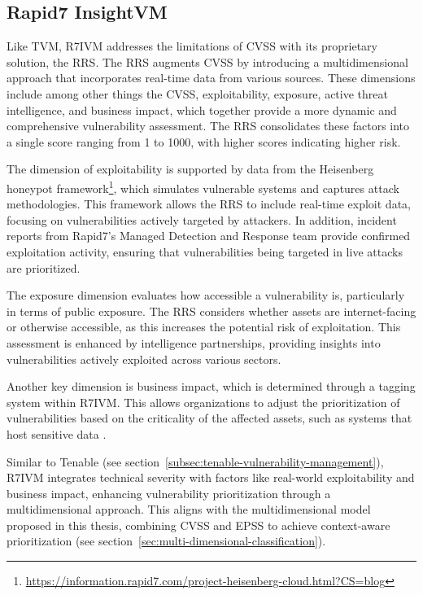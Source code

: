 \subsection{Rapid7 InsightVM}
\label{subsec:rapid7-insightvm}

Like \ac{TVM}, \ac{R7IVM} addresses the limitations of \ac{CVSS} with its proprietary solution, the \ac{RRS}. The \ac{RRS} augments \ac{CVSS} by introducing a multidimensional approach that incorporates real-time data from various sources. These dimensions include among other things the \ac{CVSS}, exploitability, exposure, active threat intelligence, and business impact, which together provide a more dynamic and comprehensive vulnerability assessment. The \ac{RRS} consolidates these factors into a single score ranging from 1 to 1000, with higher scores indicating higher risk.

The dimension of exploitability is supported by data from the Heisenberg honeypot framework\footnote{\url{https://information.rapid7.com/project-heisenberg-cloud.html?CS=blog}}, which simulates vulnerable systems and captures attack methodologies. This framework allows the \ac{RRS} to include real-time exploit data, focusing on vulnerabilities actively targeted by attackers. In addition, incident reports from Rapid7's Managed Detection and Response team provide confirmed exploitation activity, ensuring that vulnerabilities being targeted in live attacks are prioritized.

The exposure dimension evaluates how accessible a vulnerability is, particularly in terms of public exposure. The \ac{RRS} considers whether assets are internet-facing or otherwise accessible, as this increases the potential risk of exploitation. This assessment is enhanced by intelligence partnerships, providing insights into vulnerabilities actively exploited across various sectors.

Another key dimension is business impact, which is determined through a tagging system within \ac{R7IVM}. This allows organizations to adjust the prioritization of vulnerabilities based on the criticality of the affected assets, such as systems that host sensitive data \autocite{rapid7_live_2017}.

Similar to Tenable (see section~\ref{subsec:tenable-vulnerability-management}), \ac{R7IVM} integrates technical severity with factors like real-world exploitability and business impact, enhancing vulnerability prioritization through a multidimensional approach. This aligns with the multidimensional model proposed in this thesis, combining \ac{CVSS} and \ac{EPSS} to achieve context-aware prioritization (see section~\ref{sec:multi-dimensional-classification}).


